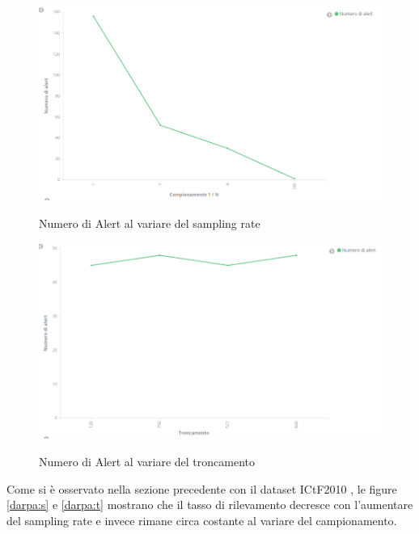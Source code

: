 \documentclass[12pt,a4paper,openright,twoside]{report}
\begin{document}
\begin{figure}[h!]
\begin{center}                          %
  \includegraphics[width=\textwidth]{images/DARPA-sampling-rate.png}
  \caption{Numero di Alert al variare del sampling rate}\label{darpa:s}
  \label{}
\end{center}
\end{figure}
\begin{figure}[h!]
\begin{center}                          %
  \includegraphics[width=\textwidth]{images/DARPA-troncamento.png}\label{darpa:t}
  \caption{Numero di Alert al variare del troncamento}
  \label{}
\end{center}
\end{figure}
 Come si \`e osservato nella sezione precedente con il dataset ICtF2010 , le figure \ref{darpa:s}
 e \ref{darpa:t} mostrano che il tasso di rilevamento decresce con l'aumentare del
 sampling rate e invece rimane circa costante al variare del campionamento.
\end{document}
